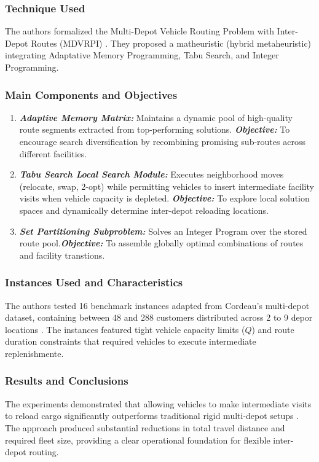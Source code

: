 \documentclass[conference]{IEEEtran}
\begin{document}
\subsubsection{Technique Used}
The authors formalized the Multi-Depot Vehicle Routing Problem with Inter-Depot Routes (MDVRPI) \cite{crevier2007multi}. They proposed a matheuristic (hybrid metaheuristic) integrating Adaptative Memory Programming, Tabu Search, and Integer Programming. 

\subsubsection{Main Components and Objectives}
\begin{enumerate}
    \item \textbf{\textit{Adaptive Memory Matrix:}} Maintains a dynamic pool of high-quality route segments extracted from top-performing solutions. \textbf{\textit{Objective:}} To encourage search diversification by recombining promising sub-routes across different facilities.

    \item \textbf{\textit{Tabu Search Local Search Module:}} Executes neighborhood moves (relocate, swap, 2-opt) while permitting vehicles to insert intermediate facility visits when vehicle capacity is depleted. \textbf{\textit{Objective:}} To explore local solution spaces and dynamically determine inter-depot reloading locations.

    \item \textbf{\textit{Set Partitioning Subproblem:}} Solves an Integer Program over the stored route pool.\textbf{\textit{Objective:}} To assemble globally optimal combinations of routes and facility transtions.
\end{enumerate}

\subsubsection{Instances Used and Characteristics}
The authors tested 16 benchmark instances adapted from Cordeau's multi-depot dataset, containing between 48 and 288 customers distributed across 2 to 9 depor locations \cite{crevier2007multi}. The instances featured tight vehicle capacity limits ($Q$) and route duration constraints that required vehicles to execute intermediate replenishmente.

\subsubsection{Results and Conclusions}
The experiments demonstrated that allowing vehicles to make intermediate visits to reload cargo significantly outperforms traditional rigid multi-depot setups \cite{crevier2007multi}. The approach produced substantial reductions in total travel distance and required fleet size, providing a clear operational foundation for flexible inter-depot routing.
\end{document}
